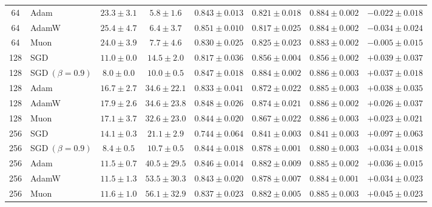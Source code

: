 \documentclass{article}
\begin{document}
\begin{table}[h]
{\begin{tabular}{cl|cc|ccc|c}
64 & Adam & $23.3 \pm 3.1$ & $5.8 \pm 1.6$ & $0.843 \pm 0.013$ & $0.821 \pm 0.018$ & $0.884 \pm 0.002$ & $-0.022 \pm 0.018$ \\
64 & AdamW & $25.4 \pm 4.7$ & $6.4 \pm 3.7$ & $0.851 \pm 0.010$ & $0.817 \pm 0.025$ & $0.884 \pm 0.002$ & $-0.034 \pm 0.024$ \\
64 & Muon & $24.0 \pm 3.9$ & $7.7 \pm 4.6$ & $0.830 \pm 0.025$ & $0.825 \pm 0.023$ & $0.883 \pm 0.002$ & $-0.005 \pm 0.015$ \\
\midrule
128 & SGD & $11.0 \pm 0.0$ & $14.5 \pm 2.0$ & $0.817 \pm 0.036$ & $0.856 \pm 0.004$ & $0.856 \pm 0.002$ & $+0.039 \pm 0.037$ \\
128 & SGD$~(\beta = 0.9)$ & $8.0 \pm 0.0$ & $10.0 \pm 0.5$ & $0.847 \pm 0.018$ & $0.884 \pm 0.002$ & $0.886 \pm 0.003$ & $+0.037 \pm 0.018$ \\
128 & Adam & $16.7 \pm 2.7$ & $34.6 \pm 22.1$ & $0.833 \pm 0.041$ & $0.872 \pm 0.022$ & $0.885 \pm 0.003$ & $+0.038 \pm 0.035$ \\
128 & AdamW & $17.9 \pm 2.6$ & $34.6 \pm 23.8$ & $0.848 \pm 0.026$ & $0.874 \pm 0.021$ & $0.886 \pm 0.002$ & $+0.026 \pm 0.037$ \\
128 & Muon & $17.1 \pm 3.7$ & $32.6 \pm 23.0$ & $0.844 \pm 0.020$ & $0.867 \pm 0.022$ & $0.886 \pm 0.003$ & $+0.023 \pm 0.021$ \\
\midrule
256 & SGD & $14.1 \pm 0.3$ & $21.1 \pm 2.9$ & $0.744 \pm 0.064$ & $0.841 \pm 0.003$ & $0.841 \pm 0.003$ & $+0.097 \pm 0.063$ \\
256 & SGD$~(\beta = 0.9)$ & $8.4 \pm 0.5$ & $10.7 \pm 0.5$ & $0.844 \pm 0.018$ & $0.878 \pm 0.001$ & $0.880 \pm 0.003$ & $+0.034 \pm 0.018$ \\
256 & Adam & $11.5 \pm 0.7$ & $40.5 \pm 29.5$ & $0.846 \pm 0.014$ & $0.882 \pm 0.009$ & $0.885 \pm 0.002$ & $+0.036 \pm 0.015$ \\
256 & AdamW & $11.5 \pm 1.3$ & $53.5 \pm 30.3$ & $0.843 \pm 0.020$ & $0.878 \pm 0.007$ & $0.884 \pm 0.001$ & $+0.034 \pm 0.023$ \\
256 & Muon & $11.6 \pm 1.0$ & $56.1 \pm 32.9$ & $0.837 \pm 0.023$ & $0.882 \pm 0.005$ & $0.885 \pm 0.003$ & $+0.045 \pm 0.023$ \\
\bottomrule
\end{tabular}}
\end{table}
\end{document}
